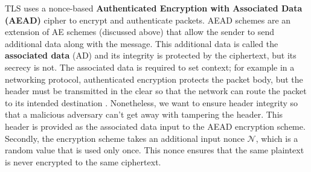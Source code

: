 TLS uses a nonce-based \textbf{Authenticated Encryption with Associated Data (AEAD)} \cite{aead} cipher to encrypt and authenticate packets. AEAD schemes are an extension of AE schemes (discussed above) that allow the sender to send additional data along with the message. This additional data is called the \textbf{associated data} (AD) and its integrity is protected by the ciphertext, but its secrecy is not. The associated data is required to set context; for example in a networking protocol, authenticated encryption protects the packet body, but the header must be transmitted in the clear so that the network can route the packet to its intended destination \cite{gradcourse}. Nonetheless, we want to ensure header integrity so that a malicious adversary can't get away with tampering the header. This header is provided as the associated data input to the AEAD encryption scheme. Secondly, the encryption scheme takes an additional input nonce $\mathcal{N}$, which is a random value that is used only once. This nonce ensures that the same plaintext is never encrypted to the same ciphertext. 
